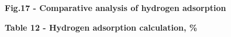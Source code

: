 

{\bfseries Fig.17 - Comparative analysis of hydrogen adsorption}

{\bfseries Table 12 - Hydrogen adsorption calculation, \%}


